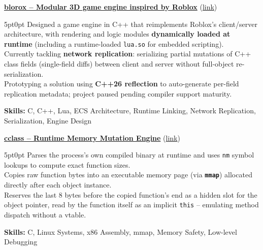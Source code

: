 \documentclass[9pt]{extarticle}
\begin{document}
\underline{{\bfseries blorox -- Modular 3D game engine inspired by Roblox}} (\href{https://github.com/paulogarithm/blorox}{link})
\par
\begin{adjustwidth}{5pt}{0pt}
	Designed a game engine in C++ that reimplements Roblox's client/server architecture, with rendering and logic modules {\bfseries dynamically loaded at runtime} (including a runtime-loaded \texttt{lua.so} for embedded scripting). \\
	Currently tackling {\bfseries network replication}: serializing partial mutations of C++ class fields (single-field diffs) between client and server without full-object re-serialization. \\
	Prototyping a solution using {\bfseries C++26 reflection} to auto-generate per-field replication metadata; project paused pending compiler support maturity.
\end{adjustwidth}
\par
{\bfseries Skills:} C, C++, Lua, ECS Architecture, Runtime Linking, Network Replication, Serialization, Engine Design

\par\vspace{1pt}

\underline{\bfseries cclass -- Runtime Memory Mutation Engine} (\href{https://github.com/paulogarithm/cclass}{link})
\par
\begin{adjustwidth}{5pt}{0pt}
    Parses the process's own compiled binary at runtime and uses \texttt{nm} symbol lookups to compute exact function sizes. \\
    Copies raw function bytes into an executable memory page (via {\bfseries \texttt{mmap}}) allocated directly after each object instance. \\
    Reserves the last 8 bytes before the copied function's end as a hidden slot for the object pointer, read by the function itself as an implicit \texttt{this} -- emulating method dispatch without a vtable.
\end{adjustwidth}
\par
{\bfseries Skills:} C, Linux Systems, x86 Assembly, mmap, Memory Safety, Low-level Debugging

\par\vspace{1pt}
\end{document}
